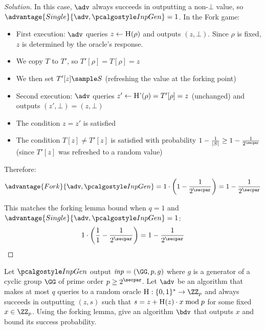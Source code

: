 \begin{proof}[Solution]
  In this case, $\adv$ always succeeds in outputting a non-$\bot$ value, so $\advantage{Single}{\adv, \algo{InpGen}} = 1$. In the Fork game:
  
  \begin{itemize}
    \item First execution: $\adv$ queries $z \gets {\normalfont\textsc{H}}(\rho)$ and outputs $(z, \bot)$. Since $\rho$ is fixed, $z$ is determined by the oracle's response.
    \item We copy $T$ to $T'$, so $T'[\rho] = T[\rho] = z$
    \item We then set $T'[z] \sample S$ (refreshing the value at the forking point)
    \item Second execution: $\adv$ queries $z' \gets {\normalfont\textsc{H'}}(\rho) = T'[\rho] = z$ (unchanged) and outputs $(z', \bot) = (z, \bot)$
    \item The condition $z = z'$ is satisfied
    \item The condition $T[z] \neq T'[z]$ is satisfied with probability $1 - \frac{1}{|S|} \geq 1 - \frac{1}{2^\secpar}$ (since $T'[z]$ was refreshed to a random value)
  \end{itemize}
  
  Therefore:
  \[
  \advantage{Fork}{\adv, \algo{InpGen}} = 1 \cdot \left(1 - \frac{1}{2^\secpar}\right) = 1 - \frac{1}{2^\secpar}
  \]
  
  This matches the forking lemma bound when $q = 1$ and $\advantage{Single}{\adv, \algo{InpGen}} = 1$:
  \[
  1 \cdot \left(\frac{1}{1} - \frac{1}{2^\secpar}\right) = 1 - \frac{1}{2^\secpar}
  \]
\end{proof}


\begin{exercise}
  Let $\algo{InpGen}$ output $\mathit{inp} = (\GG,p,g)$ where $g$ is a generator of a cyclic group $\GG$ of prime order $p \geq 2^\secpar$.
  Let $\adv$ be an algorithm that makes at most $q$ queries to a random oracle $\pcoracle{H}: \{0,1\}^* \rightarrow \ZZ_p$ and always succeeds in outputting $(z, s)$ such that $s = z + {\normalfont\textsc{H}}(z) \cdot x \bmod p$ for some fixed $x \in \ZZ_p$.
  Using the forking lemma, give an algorithm $\bdv$ that outputs $x$ and bound its success probability.
\end{exercise}

